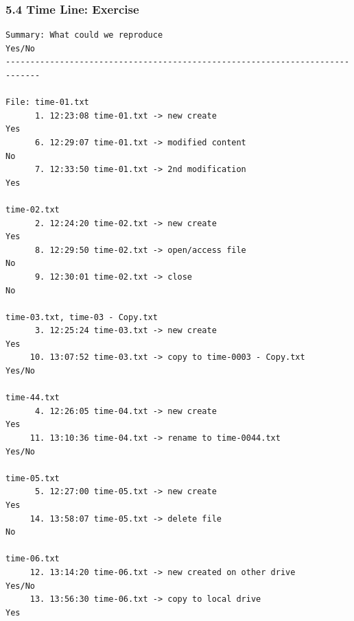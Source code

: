 \begin{frame}[fragile]
  \frametitle{5.4 Time Line: Exercise}
  \begin{lstlisting}[basicstyle=\tiny]
Summary: What could we reproduce                                       Yes/No
-----------------------------------------------------------------------------
  
File: time-01.txt
      1. 12:23:08 time-01.txt -> new create                            Yes
      6. 12:29:07 time-01.txt -> modified content                          No
      7. 12:33:50 time-01.txt -> 2nd modification                      Yes

time-02.txt
      2. 12:24:20 time-02.txt -> new create                            Yes
      8. 12:29:50 time-02.txt -> open/access file                          No
      9. 12:30:01 time-02.txt -> close                                     No

time-03.txt, time-03 - Copy.txt
      3. 12:25:24 time-03.txt -> new create                            Yes
     10. 13:07:52 time-03.txt -> copy to time-0003 - Copy.txt          Yes/No

time-44.txt
      4. 12:26:05 time-04.txt -> new create                            Yes
     11. 13:10:36 time-04.txt -> rename to time-0044.txt               Yes/No

time-05.txt
      5. 12:27:00 time-05.txt -> new create                            Yes
     14. 13:58:07 time-05.txt -> delete file                               No

time-06.txt
     12. 13:14:20 time-06.txt -> new created on other drive            Yes/No
     13. 13:56:30 time-06.txt -> copy to local drive                   Yes
  \end{lstlisting}
\end{frame}


